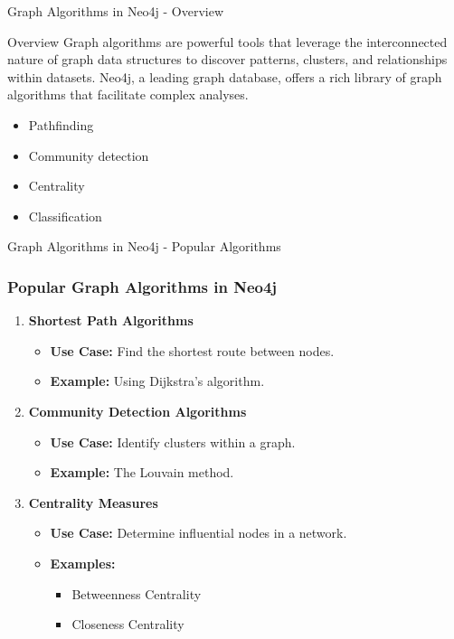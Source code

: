 \documentclass[aspectratio=169]{beamer}
\begin{document}
\begin{frame}[fragile]{Graph Algorithms in Neo4j - Overview}
  \begin{block}{Overview}
    Graph algorithms are powerful tools that leverage the interconnected nature of graph data structures to discover patterns, clusters, and relationships within datasets. Neo4j, a leading graph database, offers a rich library of graph algorithms that facilitate complex analyses.
  \end{block}
  \begin{itemize}
    \item Pathfinding
    \item Community detection
    \item Centrality
    \item Classification
  \end{itemize}
\end{frame}

\begin{frame}[fragile]{Graph Algorithms in Neo4j - Popular Algorithms}
  \frametitle{Popular Graph Algorithms in Neo4j}
  \begin{enumerate}
    \item \textbf{Shortest Path Algorithms}
      \begin{itemize}
        \item \textbf{Use Case:} Find the shortest route between nodes.
        \item \textbf{Example:} Using Dijkstra's algorithm.
      \end{itemize}
      
    \item \textbf{Community Detection Algorithms}
      \begin{itemize}
        \item \textbf{Use Case:} Identify clusters within a graph.
        \item \textbf{Example:} The Louvain method.
      \end{itemize}

    \item \textbf{Centrality Measures}
      \begin{itemize}
        \item \textbf{Use Case:} Determine influential nodes in a network.
        \item \textbf{Examples:}
          \begin{itemize}
            \item Betweenness Centrality
            \item Closeness Centrality
          \end{itemize}
      \end{itemize}
  \end{enumerate}
\end{frame}
\end{document}
